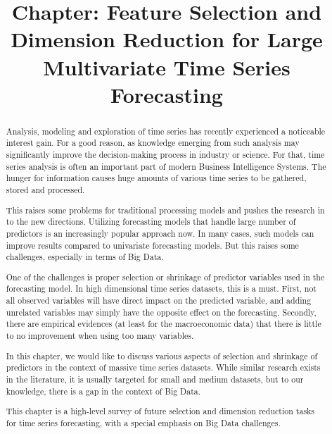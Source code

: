\documentclass[10pt]{article}
\begin{document}
%
\title{\textbf{\Large Chapter: Feature Selection and Dimension Reduction for Large Multivariate Time Series Forecasting}}

  
\maketitle

\begin{abstract}
Analysis, modeling and exploration of time series has recently experienced a noticeable interest gain. For a good reason, as knowledge emerging from such analysis may significantly improve the decision-making process in industry or science. For that, time series analysis is often an important part of modern Business Intelligence Systems. The hunger for information causes huge amounts of various time series to be gathered, stored and processed.

This raises some problems for traditional processing models and pushes the research in to the new directions. Utilizing forecasting models that handle large number of predictors is an increasingly popular approach now. In many cases, such models can improve results compared to univariate forecasting models. But this raises some challenges, especially in terms of Big Data.

One of the challenges is proper selection or shrinkage of predictor variables used in the forecasting model. In high dimensional time series datasets, this is a must. First, not all observed variables will have direct impact on the predicted variable, and adding unrelated variables may simply have the opposite effect on the forecasting. Secondly, there are empirical evidences (at least for the macroeconomic data) that there is little to no improvement when using too many variables.

In this chapter, we would like to discuss various aspects of selection and shrinkage of predictors in the context of massive time series datasets. While similar research exists in the literature, it is usually targeted for small and medium datasets, but to our knowledge, there is a gap in the context of Big Data.

This chapter is a high-level survey of future selection and dimension reduction tasks for time series forecasting, with a special emphasis on Big Data challenges.

\end{abstract}
\end{document}

